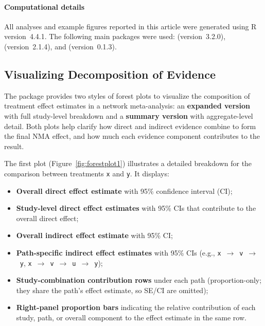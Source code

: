 \paragraph{Computational details}

All analyses and example figures reported in this article were generated using
\textsf{R} version~4.4.1. The following main packages were used: 
(version~3.2.0),  (version~2.1.4), and 
(version~0.1.3).

\subsection{Visualizing Decomposition of Evidence}

The  package provides two styles of forest plots to visualize the composition of treatment effect estimates in a network meta-analysis: an \textbf{expanded version} with full study-level breakdown and a \textbf{summary version} with aggregate-level detail. Both plots help clarify how direct and indirect evidence combine to form the final NMA effect, and how much each evidence component contributes to the result.

The first plot (Figure~\ref{fig:forestplot1}) illustrates a detailed breakdown for the comparison between treatments \texttt{x} and \texttt{y}. It displays:
\begin{itemize}
  \item \textbf{Overall direct effect estimate} with 95\% confidence interval (CI);
  \item \textbf{Study-level direct effect estimates} with 95\% CIs that contribute to the overall direct effect;
  \item \textbf{Overall indirect effect estimate} with 95\% CI;
  \item \textbf{Path-specific indirect effect estimates} with 95\% CIs (e.g., \texttt{x}~$\rightarrow$~\texttt{v}~$\rightarrow$~\texttt{y}, \texttt{x}~$\rightarrow$~\texttt{v}~$\rightarrow$~\texttt{u}~$\rightarrow$~\texttt{y});
  \item \textbf{Study-combination contribution rows} under each path (proportion-only; they share the path’s effect estimate, so SE/CI are omitted);
  \item \textbf{Right-panel proportion bars} indicating the relative contribution of each study, path, or overall component to the effect estimate in the same row.
\end{itemize}

